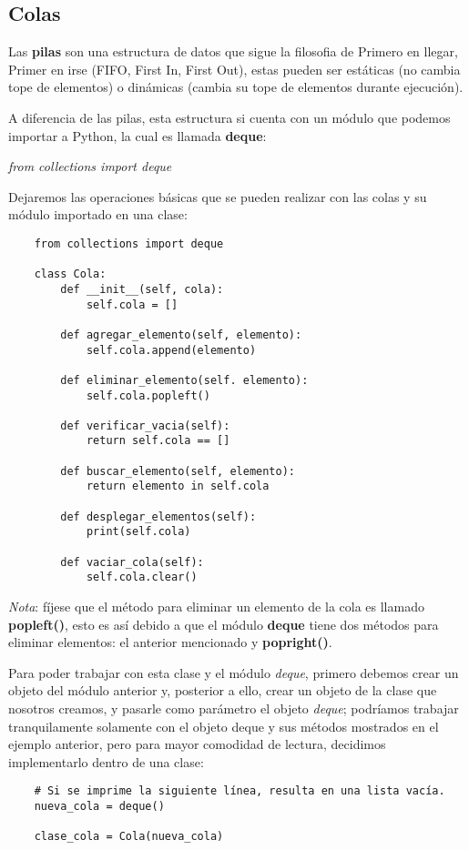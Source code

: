 \subsection{Colas}
\hspace{0.55cm}Las \textbf{pilas} son una estructura de datos que sigue la filosofia de Primero en llegar, Primer en irse (FIFO, First In, First Out), estas pueden ser estáticas (no cambia tope de elementos) o dinámicas (cambia su tope de elementos durante ejecución).

A diferencia de las pilas, esta estructura si cuenta con un módulo que podemos importar a Python, la cual es llamada \textbf{deque}:
\begin{center}
	\textit{from collections import deque}
\end{center}

Dejaremos las operaciones básicas que se pueden realizar con las colas y su módulo importado en una clase:
\begin{lstlisting}
	from collections import deque

	class Cola:
		def __init__(self, cola):
			self.cola = []
			
		def agregar_elemento(self, elemento):
			self.cola.append(elemento)
			
		def eliminar_elemento(self. elemento):
			self.cola.popleft()
			
		def verificar_vacia(self):
			return self.cola == []
			
		def buscar_elemento(self, elemento):
			return elemento in self.cola
				
		def desplegar_elementos(self):
			print(self.cola)
			
		def vaciar_cola(self):
			self.cola.clear()
\end{lstlisting}

\textit{Nota}: fíjese que el método para eliminar un elemento de la cola es llamado \textbf{popleft()}, esto es así debido a que el módulo \textbf{deque} tiene dos métodos para eliminar elementos: el anterior mencionado y \textbf{popright()}.

Para poder trabajar con esta clase y el módulo \textit{deque}, primero debemos crear un objeto del módulo anterior y, posterior a ello, crear un objeto de la clase que nosotros creamos, y pasarle como parámetro el objeto \textit{deque}; podríamos trabajar tranquilamente solamente con el objeto deque y sus métodos mostrados en el ejemplo anterior, pero para mayor comodidad de lectura, decidimos implementarlo dentro de una clase:
\begin{lstlisting}
	# Si se imprime la siguiente línea, resulta en una lista vacía.
	nueva_cola = deque()
	
	clase_cola = Cola(nueva_cola)
\end{lstlisting}


